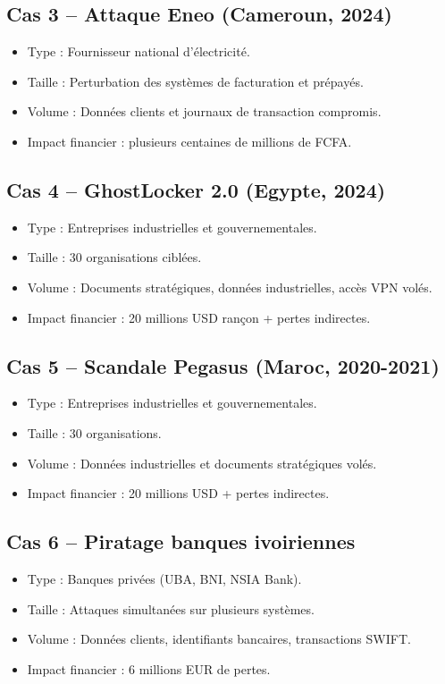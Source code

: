 \documentclass[12pt]{article}
\begin{document}
\begin{center}
\subsection{Cas 3 – Attaque Eneo (Cameroun, 2024)}
\begin{itemize}[leftmargin=*, label=\textbullet]
    \item Type : Fournisseur national d’électricité.
    \item Taille : Perturbation des systèmes de facturation et prépayés.
    \item Volume : Données clients et journaux de transaction compromis.
    \item Impact financier : plusieurs centaines de millions de FCFA.
\end{itemize}

\subsection{Cas 4 – GhostLocker 2.0 (Egypte, 2024)}
\begin{itemize}[leftmargin=*, label=\textbullet]
    \item Type : Entreprises industrielles et gouvernementales.
    \item Taille : 30 organisations ciblées.
    \item Volume : Documents stratégiques, données industrielles, accès VPN volés.
    \item Impact financier : 20 millions USD rançon + pertes indirectes.
\end{itemize}

\subsection{Cas 5 – Scandale Pegasus (Maroc, 2020-2021)}
\begin{itemize}[leftmargin=*, label=\textbullet]
    \item Type : Entreprises industrielles et gouvernementales.
    \item Taille : 30 organisations.
    \item Volume : Données industrielles et documents stratégiques volés.
    \item Impact financier : 20 millions USD + pertes indirectes.
\end{itemize}

\subsection{Cas 6 – Piratage banques ivoiriennes}
\begin{itemize}[leftmargin=*, label=\textbullet]
    \item Type : Banques privées (UBA, BNI, NSIA Bank).
    \item Taille : Attaques simultanées sur plusieurs systèmes.
    \item Volume : Données clients, identifiants bancaires, transactions SWIFT.
    \item Impact financier : 6 millions EUR de pertes.
\end{itemize}


\end{center}
\end{document}
